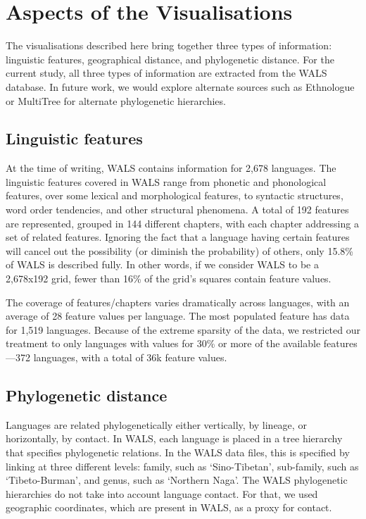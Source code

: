\documentclass[11pt]{article}
\begin{document}
\section{Aspects of the Visualisations}

The visualisations described here bring together three types of information: linguistic features, geographical distance, and phylogenetic distance. For the current study, all three types of information are extracted from the WALS database. In future work, we would explore alternate sources such as Ethnologue \cite{ethnologue} or MultiTree  for alternate phylogenetic hierarchies. 

\subsection{Linguistic features}
At the time of writing, WALS contains information for 2,678 languages. The linguistic features covered in WALS range from phonetic and phonological features, over some lexical and morphological features, to syntactic structures, word order tendencies, and other structural phenomena. A total of 192 features are represented, grouped in 144 different chapters, with each chapter addressing a set of related features.  Ignoring the fact that a language having certain features will cancel out the possibility (or diminish the probability) of others, only 15.8\% of WALS is described fully. In other words, if we consider WALS to be a 2,678x192 grid, fewer than 16\% of the grid's squares contain feature values.

The coverage of features/chapters varies dramatically across languages, with an average of 28 feature values per language. The most populated feature has data for 1,519 languages. Because of the extreme sparsity of the data, we restricted our treatment to only languages with values for 30\% or more of the available features---372 languages, with a total of 36k feature values.

\subsection{Phylogenetic distance}

Languages are related phylogenetically either vertically, by lineage, or horizontally, by contact. In WALS, each language is placed in a tree hierarchy that specifies phylogenetic relations. In the WALS data files, this is specified by linking at three different levels: family, such as `Sino-Tibetan', sub-family, such as `Tibeto-Burman', and genus, such as `Northern Naga'. The WALS phylogenetic hierarchies do not take into account language contact. For that, we used geographic coordinates, which are present in WALS, as a proxy for contact. 
\end{document}
